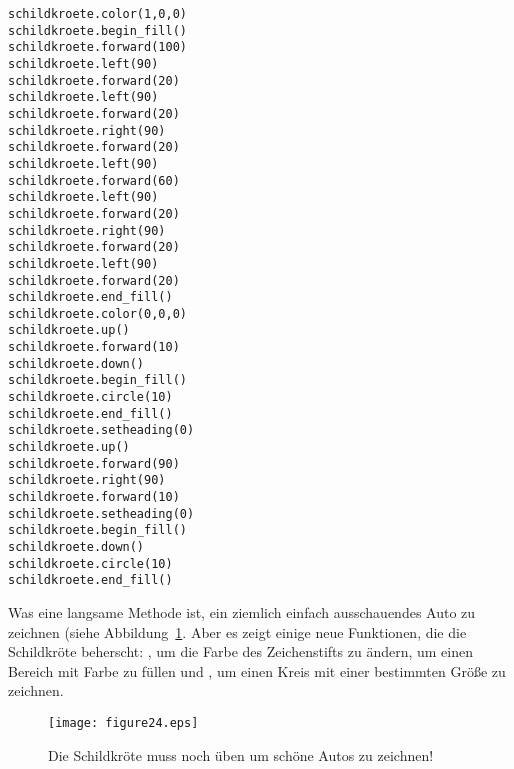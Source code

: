 \begin{Verbatim}[frame=single]
schildkroete.color(1,0,0)
schildkroete.begin_fill()
schildkroete.forward(100)
schildkroete.left(90)
schildkroete.forward(20)
schildkroete.left(90)
schildkroete.forward(20)
schildkroete.right(90)
schildkroete.forward(20)
schildkroete.left(90)
schildkroete.forward(60)
schildkroete.left(90)
schildkroete.forward(20)
schildkroete.right(90)
schildkroete.forward(20)
schildkroete.left(90)
schildkroete.forward(20)
schildkroete.end_fill()
schildkroete.color(0,0,0)
schildkroete.up()
schildkroete.forward(10)
schildkroete.down()
schildkroete.begin_fill()
schildkroete.circle(10)
schildkroete.end_fill()
schildkroete.setheading(0)
schildkroete.up()
schildkroete.forward(90)
schildkroete.right(90)
schildkroete.forward(10)
schildkroete.setheading(0)
schildkroete.begin_fill()
schildkroete.down()
schildkroete.circle(10)
schildkroete.end_fill()
\end{Verbatim}

\noindent
Was eine langsame Methode ist, ein ziemlich einfach ausschauendes Auto zu zeichnen (siehe Abbildung~\ref{fig24}. Aber es zeigt einige neue Funktionen, die die Schildkröte beherscht: , um die Farbe des Zeichenstifts zu ändern,  um einen Bereich mit Farbe zu füllen und , um einen Kreis mit einer bestimmten Größe zu zeichnen.

\begin{figure}
\begin{center}
\texttt{[image: figure24.eps]}
\end{center}
\caption{Die Schildkröte muss noch üben um schöne Autos zu zeichnen!}\label{fig24}
\end{figure}

